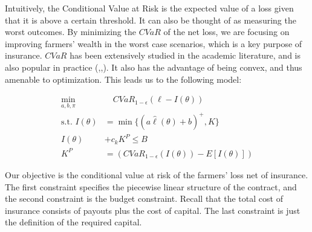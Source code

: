 \documentclass[11pt]{article}
\begin{document}
  Intuitively, the Conditional Value at Risk is the expected value of a loss given that it is above a certain threshold. It can also be thought of as measuring the worst outcomes. By minimizing the $CVaR$ of the net loss, we are focusing on improving farmers' wealth in the worst case scenarios, which is a key purpose of insurance. $CVaR$ has been extensively studied in the academic literature, and is also popular in practice (\cite{rockafellar2000optimization},\cite{rockafellar2002conditional},\cite{artzner1999coherent}). It also has the advantage of being convex, and thus amenable to optimization. This leads us to the following model: 

  \begin{align}
  \min_{a,b,\pi}  & \quad CVaR_{1-\epsilon}\left ( \ell - I(\theta) \right)\\
  \text{s.t.   }I(\theta) &= \min \{ (a\hat{\ell}(\theta) + b)^+,K \} \\
  I(\theta) &+ c_k K^P \leq B \\
  K^P &= \left( CVaR_{1-\epsilon}\left ( I(\theta) \right ) - E[I(\theta)] \right) \label{cons-budget}
  \end{align}

  Our objective is the conditional value at risk of the farmers' loss net of insurance. The first constraint specifies the piecewise linear structure of the contract, and the second constraint is the budget constraint. Recall that the total cost of insurance consists of payouts plus the cost of capital. The last constraint is just the definition of the required capital. 


\end{document}
